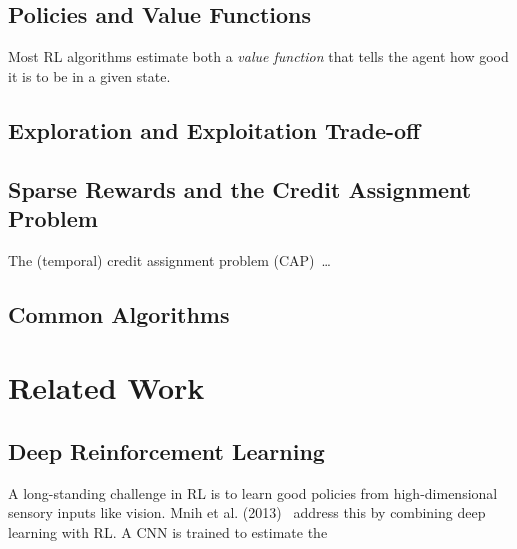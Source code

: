 \subsection{Policies and Value Functions}

Most RL algorithms estimate both a \textit{value function} that tells the agent how good it is to be in a given state.
\cite{sutton_reinforcement_2018}


\subsection{Exploration and Exploitation Trade-off}

\subsection{Sparse Rewards and the Credit Assignment Problem}



The (temporal) credit assignment problem (CAP)~\cite{minsky_cap_1961}\dots

\subsection{Common Algorithms}



\section{Related Work}

\subsection{Deep Reinforcement Learning}


A long-standing challenge in RL is to learn good policies from high-dimensional sensory inputs like vision.
Mnih et al. (2013)~\cite{mnih_atari_2013} address this by combining deep learning with RL.
A CNN is trained to estimate the 

